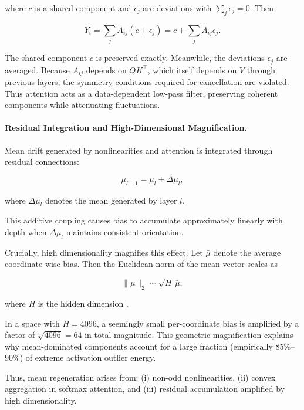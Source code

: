where $c$ is a shared component and $\epsilon_j$ are deviations
with $\sum_j \epsilon_j = 0$.
Then

\begin{equation}
Y_i
=
\sum_j A_{ij}(c + \epsilon_j)
=
c + \sum_j A_{ij}\epsilon_j.
\label{eq:attention_mean_preserve}
\end{equation}

The shared component $c$ is preserved exactly.
Meanwhile, the deviations $\epsilon_j$ are averaged.
Because $A_{ij}$ depends on $QK^\top$,
which itself depends on $V$ through previous layers,
the symmetry conditions required for cancellation are violated.
Thus attention acts as a data-dependent low-pass filter,
preserving coherent components while attenuating fluctuations.

\paragraph{Residual Integration and High-Dimensional Magnification.}

Mean drift generated by nonlinearities and attention
is integrated through residual connections:

\begin{equation}
\mu_{l+1}
=
\mu_l + \Delta\mu_l,
\label{eq:residual_accumulation}
\end{equation}

where $\Delta\mu_l$ denotes the mean generated by layer $l$.

This additive coupling causes bias to accumulate approximately linearly
with depth when $\Delta\mu_l$ maintains consistent orientation.

Crucially, high dimensionality magnifies this effect.
Let $\bar{\mu}$ denote the average coordinate-wise bias.
Then the Euclidean norm of the mean vector scales as

\begin{equation}
\|\mu\|_2
\sim
\sqrt{H}\,\bar{\mu},
\label{eq:mean_scaling}
\end{equation}

where $H$ is the hidden dimension
\cite{tropp2012user,halko2011randomized}.

In a space with $H=4096$,
a seemingly small per-coordinate bias is amplified
by a factor of $\sqrt{4096}=64$ in total magnitude.
This geometric magnification explains why mean-dominated components
account for a large fraction (empirically $85\%$–$90\%$)
of extreme activation outlier energy.

Thus, mean regeneration arises from:
(i) non-odd nonlinearities,
(ii) convex aggregation in softmax attention,
and (iii) residual accumulation amplified by high dimensionality.


